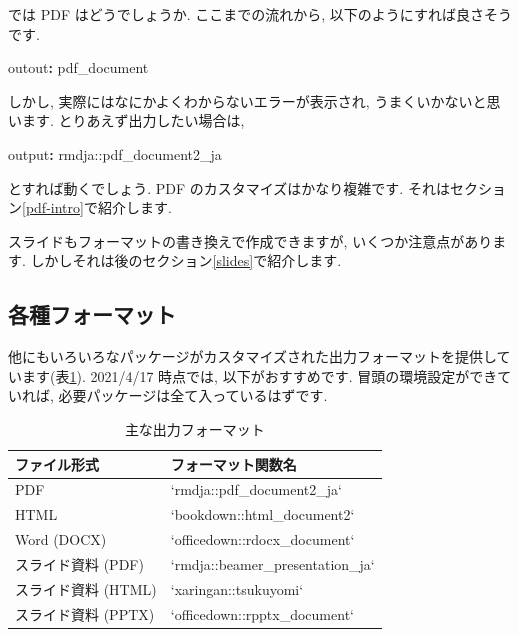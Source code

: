 \documentclass[
]{ltjsarticle}
\newenvironment{Shaded}{\begin{snugshade}}{\end{snugshade}}
\newcommand{\AttributeTok}[1]{\textcolor[rgb]{0.77,0.63,0.00}{#1}}
\newcommand{\FunctionTok}[1]{\textcolor[rgb]{0.00,0.00,0.00}{#1}}
\newcommand{\KeywordTok}[1]{\textcolor[rgb]{0.13,0.29,0.53}{\textbf{#1}}}
\begin{document}
では PDF はどうでしょうか. ここまでの流れから, 以下のようにすれば良さそうです.

\begin{Shaded}
\begin{Highlighting}[]
\FunctionTok{outout}\KeywordTok{:}\AttributeTok{ pdf\_document}
\end{Highlighting}
\end{Shaded}

しかし, 実際にはなにかよくわからないエラーが表示され, うまくいかないと思います. とりあえず出力したい場合は,

\begin{Shaded}
\begin{Highlighting}[]
\FunctionTok{output}\KeywordTok{:}\AttributeTok{ rmdja::pdf\_document2\_ja}
\end{Highlighting}
\end{Shaded}

とすれば動くでしょう. PDF のカスタマイズはかなり複雑です. それはセクション\ref{pdf-intro}で紹介します.

スライドもフォーマットの書き換えで作成できますが, いくつか注意点があります. しかしそれは後のセクション\ref{slides}で紹介します.

\hypertarget{ux5404ux7a2eux30d5ux30a9ux30fcux30deux30c3ux30c8}{%
\subsection{各種フォーマット}\label{ux5404ux7a2eux30d5ux30a9ux30fcux30deux30c3ux30c8}}

他にもいろいろなパッケージがカスタマイズされた出力フォーマットを提供しています(表\ref{tab:format-tab}). 2021/4/17 時点では, 以下がおすすめです. 冒頭の環境設定ができていれば, 必要パッケージは全て入っているはずです.

\begin{table}

\caption{\label{tab:format-tab}主な出力フォーマット}
\centering
\begin{tabular}[t]{ll}
\toprule
ファイル形式 & フォーマット関数名\\
\midrule
PDF & `rmdja::pdf\_document2\_ja`\\
HTML & `bookdown::html\_document2`\\
Word (DOCX) & `officedown::rdocx\_document`\\
スライド資料 (PDF) & `rmdja::beamer\_presentation\_ja`\\
スライド資料 (HTML) & `xaringan::tsukuyomi`\\
\addlinespace
スライド資料 (PPTX) & `officedown::rpptx\_document`\\
\bottomrule
\end{tabular}
\end{table}
\end{document}
